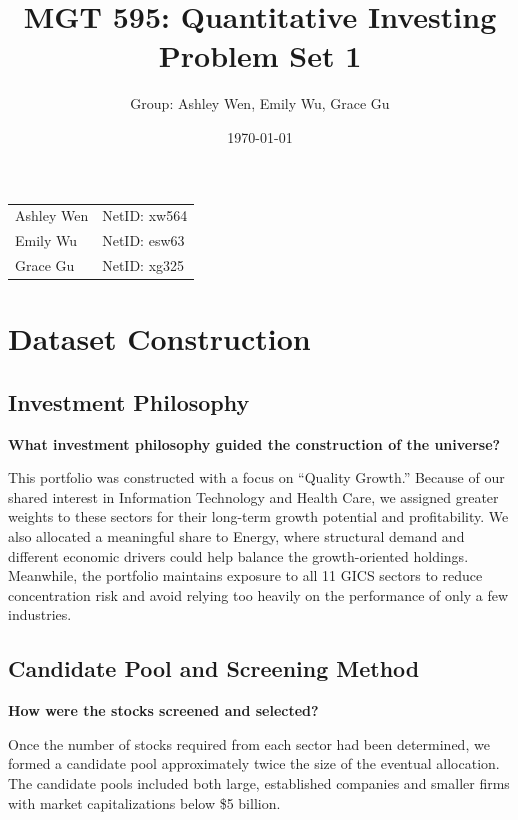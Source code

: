 \documentclass[11pt]{article}
\title{MGT 595: Quantitative Investing \\ Problem Set 1}
\author{Group: Ashley Wen, Emily Wu, Grace Gu}
\date{\today}
\begin{document}
\maketitle

\begin{center}
\begin{tabular}{ll}
Ashley Wen & NetID: xw564 \\
Emily Wu   & NetID: esw63 \\
Grace Gu   & NetID: xg325 \\
\end{tabular}
\end{center}

\vspace{1em}

\setcounter{section}{-1}

\section{Dataset Construction}

\subsection{Investment Philosophy}

\textbf{What investment philosophy guided the construction of the universe?}

This portfolio was constructed with a focus on ``Quality Growth.'' Because of
our shared interest in Information Technology and Health Care, we assigned
greater weights to these sectors for their long-term growth potential and
profitability. We also allocated a meaningful share to Energy, where structural
demand and different economic drivers could help balance the growth-oriented
holdings. Meanwhile, the portfolio maintains exposure to all 11 GICS sectors
to reduce concentration risk and avoid relying too heavily on the performance
of only a few industries.

\subsection{Candidate Pool and Screening Method}

\textbf{How were the stocks screened and selected?}

Once the number of stocks required from each sector had been determined, we
formed a candidate pool approximately twice the size of the eventual
allocation. The candidate pools included both large, established companies
and smaller firms with market capitalizations below \$5 billion.
\end{document}
